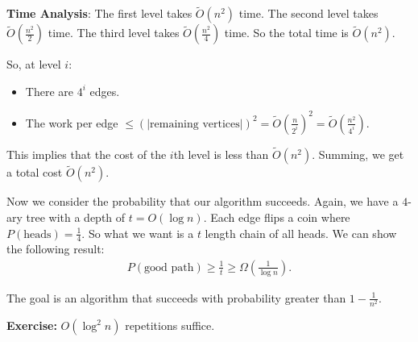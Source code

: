 \documentclass{report}
\begin{document}
\noindent \textbf{Time Analysis}: The first level takes $\tilde{O}(n^2)$ time. The second level takes $\tilde{O}\left(\frac{n^2}{2}\right)$ time. The third level takes $\tilde{O}\left(\frac{n^2}{4}\right)$ time. So the total time is $\tilde{O}(n^2)$. 

\noindent So, at level $i$:
\begin{itemize}
    \item There are $4^i$ edges.
    \item The work per edge $\leq (|\text{remaining vertices}|)^2 = \tilde{O}\left(\frac{n}{2^i}\right)^2 = \tilde{O}\left(\frac{n^2}{4^i}\right)$. 
\end{itemize}
This implies that the cost of the $i$th level is less than $\tilde O(n^2)$. Summing, we get a total cost $\tilde O(n^2)$.

Now we consider the probability that our algorithm succeeds. Again, we have a $4$-ary tree with a depth of $t = O(\log n)$. Each edge flips a coin where $P(\text{heads}) = \frac 14$. So what we want is a $t$ length chain of all heads. We can show the following result:
\begin{align*}
    P(\text{good path}) \geq \frac 1t \geq \Omega \left(\frac{1} {\log n}\right).
\end{align*}

The goal is an algorithm that succeeds with probability greater than $1 - \frac{1}{n^2}$. 

\noindent \textbf{Exercise:} $O(\log^2 n)$ repetitions suffice.
\end{document}
